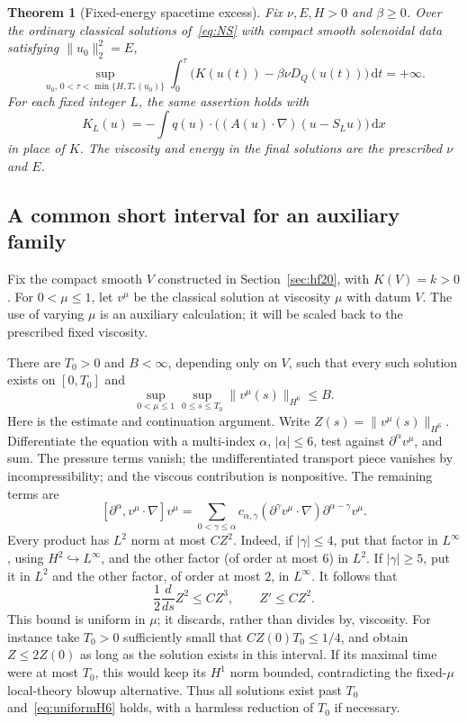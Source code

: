 \documentclass[11pt,a4paper]{article}
\newtheorem{theorem}{Theorem}[section]
\theoremstyle{definition}
\newcommand{\dd}{\,\mathrm dx}
\newcommand{\dt}{\,\mathrm dt}
\begin{document}
\begin{theorem}[Fixed-energy spacetime excess]\label{thm:spacetime}
Fix $\nu,E,H>0$ and $\beta\ge0$. Over the ordinary classical solutions of~\eqref{eq:NS} with compact smooth solenoidal data satisfying $\|u_0\|_2^2=E$,
\begin{equation}\label{eq:spacetimesup}
 \sup_{u_0,\,0<\tau<\min\{H,T_*(u_0)\}}
 \int_0^\tau\bigl(K(u(t))-\beta\nu D_Q(u(t))\bigr)\dt=+\infty.
\end{equation}
For each fixed integer $L$, the same assertion holds with
\begin{equation}\label{eq:KLdef}
 K_L(u)=-\int q(u)\cdot
       \bigl((A(u)\cdot\nabla)(u-S_Lu)\bigr)\dd
\end{equation}
in place of $K$. The viscosity and energy in the final solutions are the prescribed $\nu$ and $E$.
\end{theorem}

\subsection{A common short interval for an auxiliary family}
Fix the compact smooth $V$ constructed in Section~\ref{sec:hf20}, with $K(V)=k>0$. For $0<\mu\le1$, let $v^\mu$ be the classical solution at viscosity $\mu$ with datum $V$. The use of varying $\mu$ is an auxiliary calculation; it will be scaled back to the prescribed fixed viscosity.

There are $T_0>0$ and $B<\infty$, depending only on $V$, such that every such solution exists on $[0,T_0]$ and
\begin{equation}\label{eq:uniformH6}
 \sup_{0<\mu\le1}\sup_{0\le s\le T_0}\|v^\mu(s)\|_{H^6}\le B.
\end{equation}
Here is the estimate and continuation argument. Write $Z(s)=\|v^\mu(s)\|_{H^6}$. Differentiate the equation with a multi-index $\alpha$, $|\alpha|\le6$, test against $\partial^\alpha v^\mu$, and sum. The pressure terms vanish; the undifferentiated transport piece vanishes by incompressibility; and the viscous contribution is nonpositive. The remaining terms are
\[
 [\partial^\alpha,v^\mu\cdot\nabla]v^\mu
 =\sum_{0<\gamma\le\alpha}c_{\alpha,\gamma}
 (\partial^\gamma v^\mu\cdot\nabla)
        \partial^{\alpha-\gamma}v^\mu.
\]
Every product has $L^2$ norm at most $CZ^2$. Indeed, if $|\gamma|\le4$, put that factor in $L^\infty$, using $H^2\hookrightarrow L^\infty$, and the other factor (of order at most $6$) in $L^2$. If $|\gamma|\ge5$, put it in $L^2$ and the other factor, of order at most $2$, in $L^\infty$. It follows that
\[
 \frac12\frac{d}{ds}Z^2\le CZ^3,\qquad Z'\le CZ^2.
\]
This bound is uniform in $\mu$; it discards, rather than divides by, viscosity. For instance take $T_0>0$ sufficiently small that $CZ(0)T_0\le1/4$, and obtain $Z\le2Z(0)$ as long as the solution exists in this interval. If its maximal time were at most $T_0$, this would keep its $H^1$ norm bounded, contradicting the fixed-$\mu$ local-theory blowup alternative. Thus all solutions exist past $T_0$ and~\eqref{eq:uniformH6} holds, with a harmless reduction of $T_0$ if necessary.
\end{document}
